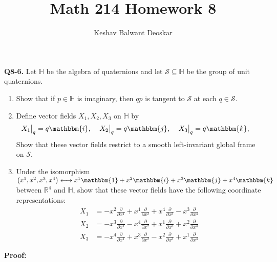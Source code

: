 \documentclass{article}
\title{Math 214 Homework 8}
\author{Keshav Balwant Deoskar}
\newcommand{\R}{\mathbb{R}}
\newcommand{\restr}[2]{{%
  \left.\kern-\nulldelimiterspace %
  #1 %
  \vphantom{\big|} %
  \right|_{#2} %
  }}
\begin{document}
\maketitle


\textbf{Q8-6.} Let $\mathbb{H}$ be the algebra of quaternions and let $\mathcal{S} \subseteq \mathbb{H}$ be the group of unit quaternions.
\begin{enumerate}[label=(\alph*)]
  \item Show that if $p \in \mathbb{H}$ is imaginary, then $qp$ is tangent to $\mathcal{S}$ at each $q \in \mathcal{S}$.
  \item Define vector fields $X_1, X_2, X_3$ on $\mathbb{H}$ by 
  \[ \restr{X_1}{q} = q \mathbbm{i}, \;\;\;\;\restr{X_2}{q} = q \mathbbm{j}, \;\;\;\;\restr{X_3}{q} = q \mathbbm{k}, \;\;\;\; \]
  Show that these vector fields restrict to a smooth left-invariant global frame on $\mathcal{S}$.
  \item Under the isomorphism $\left( x^1, x^2, x^3, x^4 \right) \longleftrightarrow x^1 \mathbbm{1} + x^2 \mathbbm{i} + x^3 \mathbbm{j} + x^4 \mathbbm{k}$ between $\R^4$ and $\mathbb{H}$, show that these vector fields have the following coordinate representations:
  \begin{align*}
    X_1 &= -x^2 \frac{\partial}{\partial x^1} + x^1 \frac{\partial}{\partial x^2} + x^4 \frac{\partial}{\partial x^3} - x^3 \frac{\partial}{\partial x^4} \\
    X_2 &= -x^3 \frac{\partial}{\partial x^1} - x^4 \frac{\partial}{\partial x^2} + x^1 \frac{\partial}{\partial x^3} + x^2 \frac{\partial}{\partial x^4} \\
    X_3 &= -x^4 \frac{\partial}{\partial x^1} + x^3 \frac{\partial}{\partial x^2} - x^2 \frac{\partial}{\partial x^3} + x^1 \frac{\partial}{\partial x^4} 
  \end{align*}
\end{enumerate}

\vskip 0.5cm
\textbf{Proof:}
\end{document}
